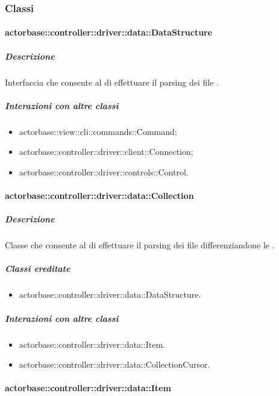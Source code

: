 \documentclass{scalatekids-article}
\begin{document}
\subsubsection{Classi}

\paragraph{actorbase::controller::driver::data::DataStructure}

\subparagraph{Descrizione}

Interfaccia che consente al  di effettuare il parsing dei file
.

\subparagraph{Interazioni con altre classi}

\begin{itemize}
\item actorbase::view::cli::commands::Command;
\item actorbase::controller::driver::client::Connection;
\item actorbase::controller::driver::controls::Control.
\end{itemize}

\paragraph{actorbase::controller::driver::data::Collection}

\subparagraph{Descrizione}

Classe che consente al  di effettuare il parsing dei file
 differenziandone le .

\subparagraph{Classi ereditate}

\begin{itemize}
\item actorbase::controller::driver::data::DataStructure.
\end{itemize}

\subparagraph{Interazioni con altre classi}

\begin{itemize}
\item actorbase::controller::driver::data::Item.
\item actorbase::controller::driver::data::CollectionCursor.
\end{itemize}

\paragraph{actorbase::controller::driver::data::Item}
\end{document}
